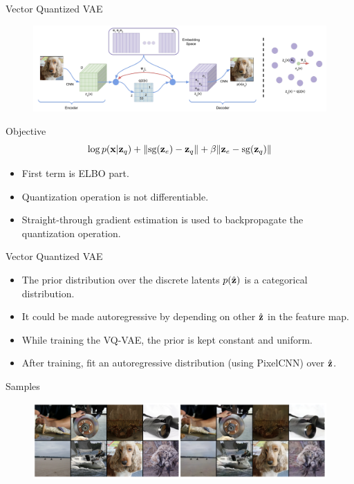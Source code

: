 \begin{frame}{Vector Quantized VAE}
	\begin{figure}
		\centering
		\includegraphics[width=\linewidth]{figs/vqvae}
	\end{figure}
	\begin{block}{Objective}
		\vspace{-0.3cm}
		\[
			\log p(\mathbf{x} | \mathbf{z}_q) + \| \text{sg} (\mathbf{z}_e) - \mathbf{z}_q \| + \beta \| \mathbf{z}_e - \text{sg}(\mathbf{z}_q) \|
		\]
	\end{block}
	\begin{itemize}
		\item First term is ELBO part.
		\item Quantization operation is not differentiable.
		\item Straight-through gradient estimation is used to backpropagate the quantization operation.
	\end{itemize}

\end{frame}
\begin{frame}{Vector Quantized VAE}
	\begin{itemize}
		\item The prior distribution over the discrete latents $p(\hat{\mathbf{z}})$ is a categorical distribution.
		\item It could be made autoregressive by depending on other $\hat{\mathbf{z}}$ in the feature map. 
		\item While training the VQ-VAE, the prior is kept constant and uniform. 
		\item After training, fit an autoregressive distribution (using PixelCNN) over $\hat{\mathbf{z}}$.
	\end{itemize}
	\begin{block}{Samples}
		\begin{figure}
			\centering
			\includegraphics[width=\linewidth]{figs/vqvae_results}
		\end{figure}
	\end{block}

\end{frame}
